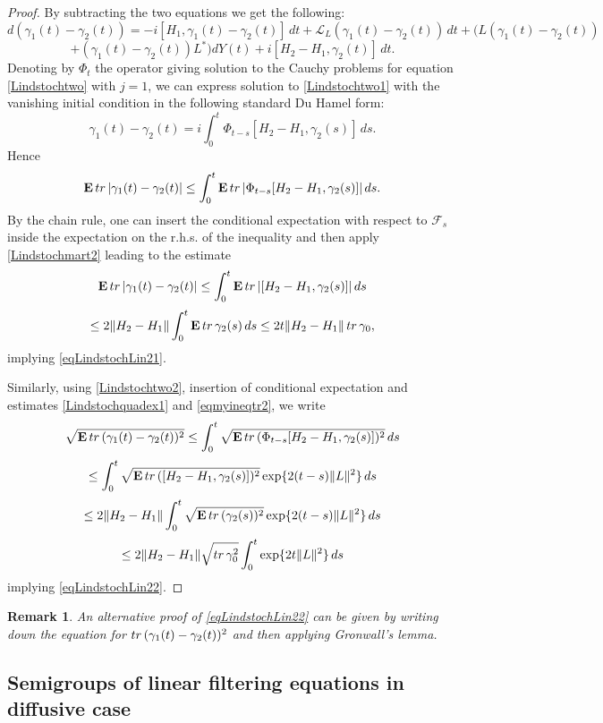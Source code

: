 \documentclass[10pt,a4paper]{amsart}
\def\LC{\mathcal{L}}
\def\FC{\mathcal{F}}
\def\E{\mathbf{E}}
\def\tr{\rm{tr}}
\def\ga{\gamma}
\newtheorem{remark}{Remark}
\begin{document}
\begin{proof}
By subtracting the two equations we get the following:
\[
d(\ga_1(t)-\ga_2(t))=-i[H_1,\ga_1(t)-\ga_2(t)] \, dt
+\LC_L (\ga_1(t)-\ga_2(t)) \, dt +(L(\ga_1(t)-\ga_2(t))
\]
\begin{equation}
\label{Lindstochtwo1}
+(\ga_1(t)-\ga_2(t)) L^*) dY(t)
+i[H_2-H_1, \ga_2(t)] \, dt.
\end{equation}
Denoting by $\Phi_t$ the operator giving solution to the Cauchy problems for equation \eqref{Lindstochtwo}
with $j=1$, we can express solution to \eqref{Lindstochtwo1} with the vanishing
initial condition in the following standard Du Hamel form:
\begin{equation}
\label{Lindstochtwo2}
\ga_1(t)-\ga_2(t)=i\int_0^t \Phi_{t-s} [H_2-H_1, \ga_2(s)] \, ds.
\end{equation}
Hence
\[
\E \, {\tr}\, |\ga_1(t)-\ga_2(t)|\le \int_0^t \E \, {\tr} \, |\Phi_{t-s} [H_2-H_1, \ga_2(s)]| \, ds.
\]
By the chain rule,  one can insert the conditional expectation with
respect to $\FC_s$ inside the expectation on the r.h.s. of the inequality
and then apply \eqref{Lindstochmart2} leading to the estimate
\[
\E \, {\tr}\, |\ga_1(t)-\ga_2(t)|\le \int_0^t \E \, {\tr} \, | [H_2-H_1, \ga_2(s)]| \, ds
\]
\[
\le 2\|H_2-H_1\| \int_0^t \E \, {\tr} \, \ga_2(s) \, ds
\le 2 t \|H_2-H_1\|  \, {\tr} \, \ga_0,
\]
implying \eqref{eqLindstochLin21}.

Similarly, using \eqref{Lindstochtwo2}, insertion of conditional expectation
and estimates  \eqref{Lindstochquadex1} and \eqref{eqmyineqtr2}, we write
\[
\sqrt{\E \, {\tr}\, (\ga_1(t)-\ga_2(t))^2}
\le \int_0^t \sqrt{ \E \, {\tr} \, (\Phi_{t-s} [H_2-H_1, \ga_2(s)])^2} \, ds
\]
\[
\le \int_0^t \sqrt{\E \, {\tr} \, ([H_2-H_1, \ga_2(s)])^2} \exp\{2(t-s)\|L\|^2\} \, ds
\]
\[
\le 2\|H_2-H_1\| \int_0^t \sqrt{\E \, {\tr} \, (\ga_2(s))^2} \exp\{2(t-s)\|L\|^2\} \, ds
\]
\[
\le 2 \|H_2-H_1\| \sqrt{{\tr} \, \ga_0^2} \int_0^t \exp\{2t\|L\|^2\} \, ds
\]
implying \eqref{eqLindstochLin22}.
\end{proof}

\begin{remark} An alternative proof of \eqref{eqLindstochLin22} can be given by writing
down the equation for ${\tr} \, (\ga_1(t)-\ga_2(t))^2$ and then applying Gronwall's lemma.
\end{remark}

\subsection{Semigroups of linear filtering equations in diffusive case}
\end{document}
